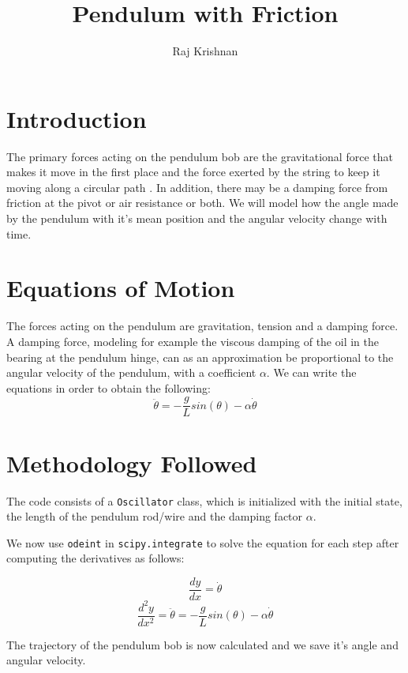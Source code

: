 \documentclass[12pt,english]{article}
\title{Pendulum with Friction}
\author{Raj Krishnan}
\begin{document}
\maketitle

\section{Introduction}
  The primary forces acting on the pendulum bob are the gravitational force 
  that makes it move in the first place and the force exerted by the string
  to keep it moving along a circular path \cite{surrow}. In addition, there may be a 
  damping force from friction at the pivot or air resistance or both. We 
  will model how the angle made by the pendulum with it's mean position and
  the angular velocity change with time.

\section{Equations of Motion}
  
  The forces acting on the pendulum are gravitation, tension and a damping
  force. A damping force, modeling for example the viscous damping of the 
  oil in the bearing at the pendulum hinge, can as an approximation be 
  proportional to the angular velocity of the pendulum, with a coefficient 
  $\alpha$. We can write the equations \cite{james} in order to obtain the 
  following:
  \begin{equation}
          \label{eq:eom}
          \ddot{\theta} = -\frac{g}{L}sin(\theta) - \alpha \dot{\theta}                    
  \end{equation}

 \section{Methodology Followed}

   The code consists of a \texttt{Oscillator} class, which is initialized with 
   the initial state, the length of the pendulum rod/wire and the damping factor
   $\alpha$. 

   We now use \texttt{odeint} in \texttt{scipy.integrate} to solve the equation 
   for each step after computing the derivatives as follows:
   
   $$\frac{dy}{dx} = \dot{\theta}$$
   $$\frac{d^2y}{dx^2} = \ddot{\theta} 
                       = -\frac{g}{L}sin(\theta) - \alpha \dot{\theta}$$

   The trajectory of the pendulum bob is now calculated and we save it's angle
   and angular velocity.

\printbibliography
\end{document}
